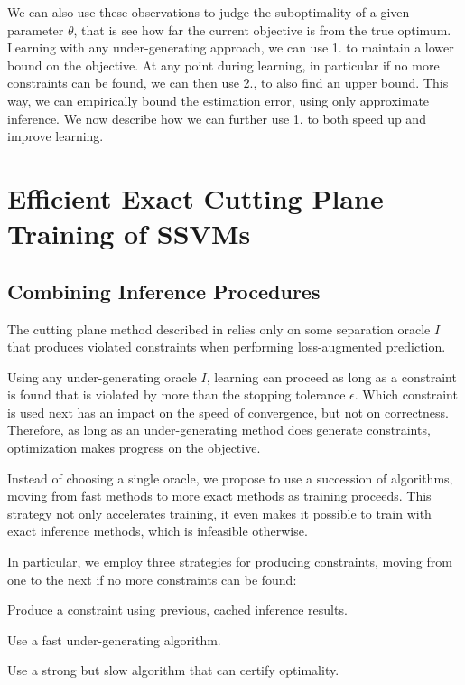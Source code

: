 We can also use these observations to judge the suboptimality of a given
parameter $\theta$, that is see how far the current objective is from the true
optimum.  Learning with any under-generating approach, we can use 1. to
maintain a lower bound on the objective. At any point during learning, in
particular if no more constraints can be found, we can then use 2., to also
find an upper bound.  This way, we can empirically bound the estimation error,
using only approximate inference.  We now describe how we can further use 1. to
both speed up and improve learning.


\section{Efficient Exact Cutting Plane Training of SSVMs}

\subsection{Combining Inference Procedures}
The cutting plane method described in  relies only
on some separation oracle $I$ that produces violated constraints when
performing loss-augmented prediction.

Using any under-generating oracle $I$, learning can proceed as long as a
constraint is found that is violated by more than the stopping tolerance
$\epsilon$.  Which constraint is used next has an impact on the speed of
convergence, but not on correctness. Therefore, as long as an under-generating
method does generate constraints, optimization makes progress on the objective.

Instead of choosing a single oracle, we propose to use a succession of
algorithms, moving from fast methods to more exact methods as training
proceeds. This strategy not only accelerates training, it even makes it
possible to train with exact inference methods, which is infeasible otherwise.

In particular, we employ three strategies for producing constraints,
moving from one to the next if no more constraints can be found:
\begin{enumerate*}
    \item Produce a constraint using previous, cached inference results.
    \item Use a fast under-generating algorithm.
    \item Use a strong but slow algorithm that can certify optimality.
\end{enumerate*}

